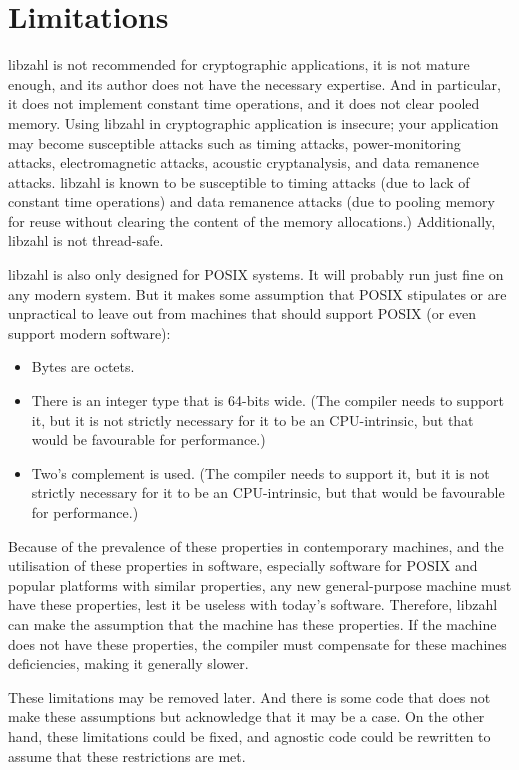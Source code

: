 \newpage
\section{Limitations}
\label{sec:Limitations}

libzahl is not recommended for cryptographic
applications, it is not mature enough, and its
author does not have the necessary expertise.
And in particular, it does not implement constant
time operations, and it does not clear pooled
memory. Using libzahl in cryptographic application
is insecure; your application may become susceptible
attacks such as timing attacks, power-monitoring
attacks, electromagnetic attacks, acoustic
cryptanalysis, and data remanence attacks. libzahl
is known to be susceptible to timing attacks
(due to lack of constant time operations) and
data remanence attacks (due to pooling memory
for reuse without clearing the content of the
memory allocations.) Additionally, libzahl is not
thread-safe.

libzahl is also only designed for POSIX systems.
It will probably run just fine on any modern
system. But it makes some assumption that POSIX
stipulates or are unpractical to leave out from
machines that should support POSIX (or even
support modern software):

\begin{itemize}
\item
Bytes are octets.

\item
There is an integer type that is 64-bits wide.
(The compiler needs to support it, but it is not
strictly necessary for it to be an CPU-intrinsic,
but that would be favourable for performance.)

\item
Two's complement is used.
(The compiler needs to support it, but it is not
strictly necessary for it to be an CPU-intrinsic,
but that would be favourable for performance.)
\end{itemize}

Because of the prevalence of these properties
in contemporary machines, and the utilisation of
these properties in software, especially software
for POSIX and popular platforms with similar
properties, any new general-purpose machine must
have these properties, lest it be useless with
today's software. Therefore, libzahl can make
the assumption that the machine has these
properties. If the machine does not have these
properties, the compiler must compensate for
these machines deficiencies, making it generally
slower.

These limitations may be removed later. And there
is some code that does not make these assumptions
but acknowledge that it may be a case. On the other
hand, these limitations could be fixed, and agnostic
code could be rewritten to assume that these
restrictions are met.

